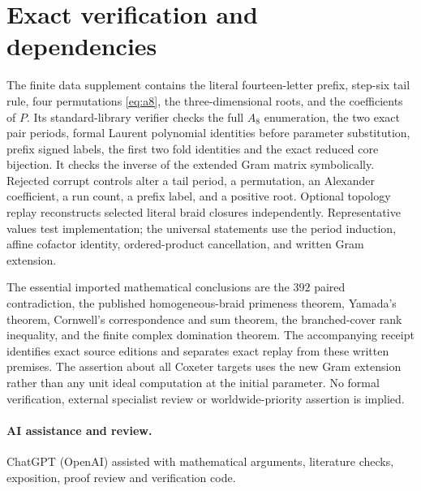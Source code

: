 \documentclass[11pt]{article}
\begin{document}
\section{Exact verification and dependencies}

The finite data supplement contains the literal fourteen-letter prefix,
step-six tail rule, four permutations \eqref{eq:a8}, the three-dimensional
roots, and the coefficients of $P$. Its standard-library verifier
checks the full $A_8$ enumeration, the two exact pair periods, formal
Laurent polynomial identities before parameter substitution, prefix
signed labels, the first two fold identities and the exact reduced
core bijection. It checks the inverse of the extended Gram matrix
symbolically. Rejected corrupt controls alter a tail period, a
permutation, an Alexander coefficient, a run count, a prefix label,
and a positive root. Optional topology replay reconstructs selected
literal braid closures independently. Representative values test
implementation; the universal statements use the period induction,
affine cofactor identity, ordered-product cancellation, and written
Gram extension.

The essential imported mathematical conclusions are the $392$ paired
contradiction, the published homogeneous-braid primeness theorem,
Yamada's theorem, Cornwell's correspondence and sum theorem, the
branched-cover rank inequality, and the finite complex domination
theorem. The accompanying receipt identifies exact source editions and
separates exact replay from these written premises. The assertion about
all Coxeter targets uses the new Gram extension rather than any unit
ideal computation at the initial parameter. No formal verification,
external specialist review or worldwide-priority assertion is implied.

\paragraph{AI assistance and review.}
ChatGPT (OpenAI) assisted with mathematical arguments, literature checks,
exposition, proof review and verification code.
\end{document}

